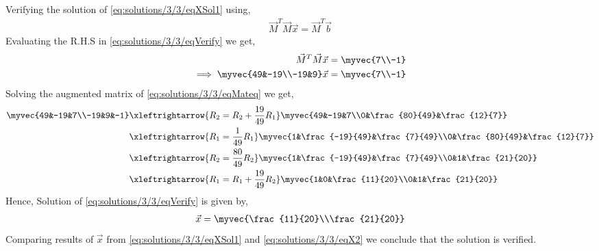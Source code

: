 Verifying the solution of \eqref{eq:solutions/3/3/eqXSol1} using,
\begin{align}
\vec{M}^T\vec{M}\vec{x} = \vec{M}^T\vec{b}\label{eq:solutions/3/3/eqVerify}
\end{align}
Evaluating the R.H.S in \eqref{eq:solutions/3/3/eqVerify} we get,
\begin{align}
\vec{M}^T\vec{M}\vec{x} &= \myvec{7\\-1}\\
\implies\myvec{49&-19\\-19&9}\vec{x} &= \myvec{7\\-1}\label{eq:solutions/3/3/eqMateq}
\end{align}
Solving the augmented matrix of \eqref{eq:solutions/3/3/eqMateq} we get,
\begin{align}
\myvec{49&-19&7\\-19&9&-1} &\xleftrightarrow{R_2=R_2+\frac{19}{49}R_1}\myvec{49&-19&7\\0&\frac{80}{49}&\frac{12}{7}}\\
&\xleftrightarrow{R_1=\frac{1}{49}R_1}\myvec{1&\frac{-19}{49}&\frac{7}{49}\\0&\frac{80}{49}&\frac{12}{7}}\\
&\xleftrightarrow{R_2=\frac{80}{49}R_2}\myvec{1&\frac{-19}{49}&\frac{7}{49}\\0&1&\frac{21}{20}}\\
&\xleftrightarrow{R_1=R_1+\frac{19}{49}R_2}\myvec{1&0&\frac{11}{20}\\0&1&\frac{21}{20}}
\end{align}
Hence, Solution of \eqref{eq:solutions/3/3/eqVerify} is given by,
\begin{align}
\vec{x}=\myvec{\frac{11}{20}\\\frac{21}{20}}\label{eq:solutions/3/3/eqX2}
\end{align}
Comparing results of $\vec{x}$ from \eqref{eq:solutions/3/3/eqXSol1} and \eqref{eq:solutions/3/3/eqX2} we conclude that the solution is verified.
